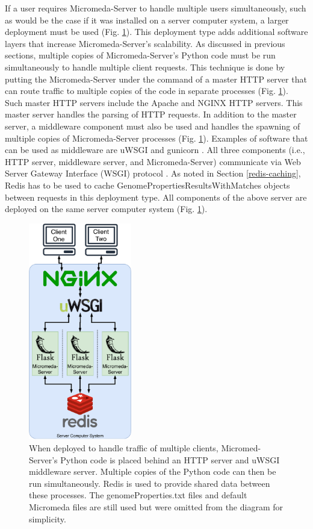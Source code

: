 If a user requires Micromeda-Server to handle multiple users simultaneously, such as would be the case if it was installed on a server computer system, a larger deployment must be used (Fig. \ref{fig:micromeda-medium-deploy}). This deployment type adds additional software layers that increase Micromeda-Server's scalability. As discussed in previous sections, multiple copies of Micromeda-Server's Python code must be run simultaneously to handle multiple client requests. This technique is done by putting the Micromeda-Server under the command of a master HTTP server that can route traffic to multiple copies of the code in separate processes (Fig. \ref{fig:micromeda-medium-deploy}). Such master HTTP servers include the Apache \cite{fielding1997apache} and NGINX \cite{reese2008nginx} HTTP servers. This master server handles the parsing of HTTP requests. In addition to the master server, a middleware component must also be used and handles the spawning of multiple copies of Micromeda-Server processes (Fig. \ref{fig:micromeda-medium-deploy}). Examples of software that can be used as middleware are uWSGI \cite{2019uwsgi} and gunicorn \cite{chesneau_2018}. All three components (i.e., HTTP server, middleware server, and Micromeda-Server) communicate via Web Server Gateway Interface (WSGI) protocol \cite{gardner2009web}. As noted in Section \ref{redis-caching}, Redis has to be used to cache GenomePropertiesResultsWithMatches objects between requests in this deployment type. All components of the above server are deployed on the same server computer system (Fig. \ref{fig:micromeda-medium-deploy}).

\begin{figure}[!ht]
  \centering
	\includegraphics[width=0.40\textwidth]{media/micromeda-medium-deployment.pdf}
	 \caption{When deployed to handle traffic of multiple clients, Micromed-Server's Python code is placed behind an HTTP server and uWSGI middleware server. Multiple copies of the Python code can then be run simultaneously. Redis is used to provide shared data between these processes. The genomeProperties.txt files and default Micromeda files are still used but were omitted from the diagram for simplicity.}
	 \label{fig:micromeda-medium-deploy}
\end{figure}

